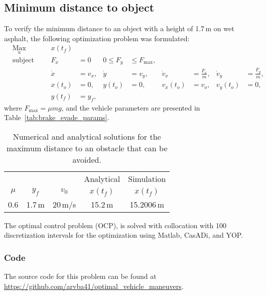 \subsection{Minimum distance to object}
To verify the minimum distance to an object with a height of 1.7\,m on wet asphalt, the following optimization problem was formulated:
\begin{align}
    & \underset{u}{\text{Max}}
    & & & x(t_f)\\
%
    & \text{subject to} 
    & & & F_x &= 0 &0 \leq F_y &\leq F_{\text{max}},\\
%
    &&& & \dot x &= v_x, & \dot y &= v_y, & \dot v_x &= \frac{F_x}{m}, & \dot v_y &= \frac{F_y}{m},\\
%
    &&& & x(t_o) &= 0, & y(t_o) &= 0, & v_x(t_o) &= v_o, & v_y(t_o) &= 0,\\
    &&& & y(t_f) &= y_f,
\end{align}
where $F_{\text{max}} = \mu m g$, and the vehicle parameters are presented in Table~\ref{tab:brake_evade_params}.
\begin{table}[h!]
    \centering
    \begin{tabular}{c|c|c|c|c}
        & & & Analytical & Simulation\\
        $\mu$ & $y_f$ & $v_0$ & $x(t_f)$ & $x(t_f)$ \\
        \hline
        0.6 & 1.7\,m & 20\,m/s & 15.2\,m & 15.2006\,m\\
    \end{tabular}
    \caption{Numerical and analytical solutions for the maximum distance to an obstacle that can be avoided.}
\end{table}

The optimal control problem (OCP), is solved with collocation with 100 discretization intervals for the optimization using Matlab, CasADi, and YOP. 

\subsubsection{Code}
The source code for this problem can be found at \newline \href{https://github.com/arvba41/optimal_vehicle_maneuvers/blob/main/uppgift/ugf3/brake_or_evade_p2c.m}{https://github.com/arvba41/optimal\_vehicle\_maneuvers}.